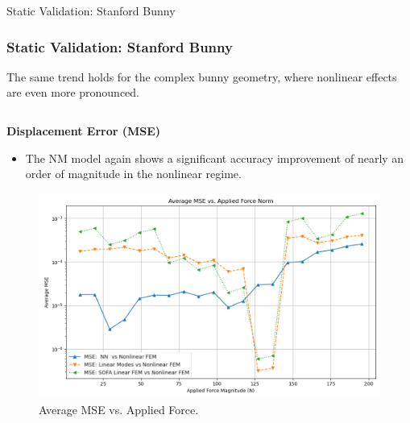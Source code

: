 \documentclass{beamer}
\begin{document}
\begin{frame}{Static Validation: Stanford Bunny}
    \frametitle{Static Validation: Stanford Bunny}
    
    The same trend holds for the complex bunny geometry, where nonlinear effects are even more pronounced.
    
    \begin{columns}[T]
        \begin{column}{0.5\textwidth}
            \textbf{Displacement Error (MSE)}
            \begin{itemize}
                \item The NM model again shows a significant accuracy improvement of nearly an order of magnitude in the nonlinear regime.
            \end{itemize}
            \begin{figure}
                \includegraphics[width=\textwidth]{Images/bunny_static_mse.png}
                \caption{Average MSE vs. Applied Force.}
            \end{figure}
        \end{column}
        

\end{columns}
\end{frame}
\end{document}
